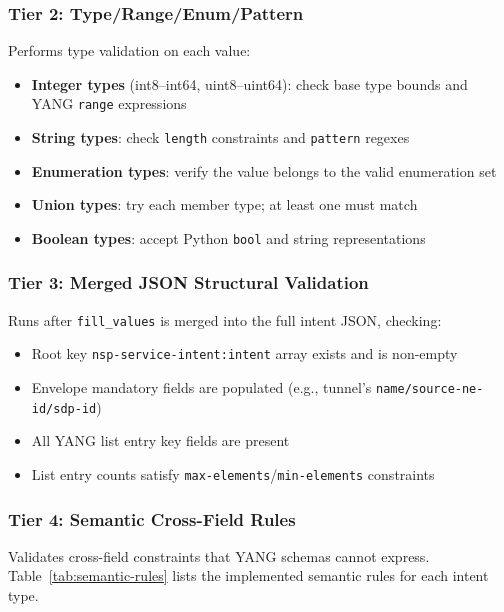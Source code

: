 \documentclass[12pt, a4paper]{article}
\newcommand{\yang}{\textsc{YANG}}
\newcommand{\fillvalues}{\texttt{fill\_values}}
\begin{document}
\subsubsection{Tier 2: Type/Range/Enum/Pattern}

Performs type validation on each value:

\begin{itemize}
  \item \textbf{Integer types} (int8--int64, uint8--uint64): check base type bounds and \yang{} \texttt{range} expressions
  \item \textbf{String types}: check \texttt{length} constraints and \texttt{pattern} regexes
  \item \textbf{Enumeration types}: verify the value belongs to the valid enumeration set
  \item \textbf{Union types}: try each member type; at least one must match
  \item \textbf{Boolean types}: accept Python \texttt{bool} and string representations
\end{itemize}

\subsubsection{Tier 3: Merged JSON Structural Validation}

Runs after \fillvalues{} is merged into the full intent JSON, checking:

\begin{itemize}
  \item Root key \texttt{nsp-service-intent:intent} array exists and is non-empty
  \item Envelope mandatory fields are populated (e.g., tunnel's \texttt{name/source-ne-id/sdp-id})
  \item All \yang{} list entry key fields are present
  \item List entry counts satisfy \texttt{max-elements}/\texttt{min-elements} constraints
\end{itemize}

\subsubsection{Tier 4: Semantic Cross-Field Rules}

Validates cross-field constraints that \yang{} schemas cannot express. Table~\ref{tab:semantic-rules} lists the implemented semantic rules for each intent type.
\end{document}
